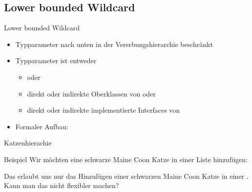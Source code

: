 \documentclass{../tuda-beamer}
\begin{document}
    \subsection{Lower bounded Wildcard}
    \label{subsec:wildcards-lowerbound}
    \begin{frame}[c]{Lower bounded Wildcard}
        \begin{itemize}
            \item Typparameter nach unten in der Vererbungshierarchie beschränkt
            \item Typparameter ist entweder
            \begin{itemize}
                \item {} oder
                \item direkt oder indirekte Oberklassen von  oder
                \item direkt oder indirekte implementierte Interfaces von 
            \end{itemize}
            \item Formaler Aufbau: 
        \end{itemize}
    \end{frame}

    \begin{frame}[c]{Katzenhierachie}
        
    \end{frame}

    \begin{frame}[c]{Beispiel}
        Wir möchten eine schwarze Maine Coon Katze in einer Liste hinzufügen:

        

        \pause

        Das erlaubt uns nur das Hinzufügen einer schwarzen Maine Coon Katze in einer
        .
        Kann man das nicht flexibler machen?
    \end{frame}

    \begin{frame}[c]
        
    \end{frame}
\end{document}
